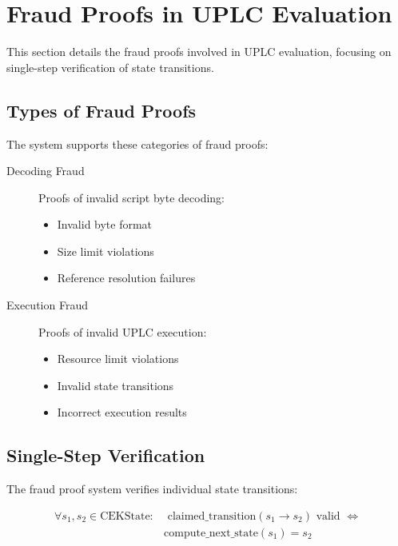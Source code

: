 \documentclass[../midgard.tex]{subfiles}
\begin{document}
\section{Fraud Proofs in UPLC Evaluation}
\label{s:phase-two-fraud-proofs}

This section details the fraud proofs involved in UPLC evaluation, focusing on single-step verification of state transitions.

\subsection{Types of Fraud Proofs}

The system supports these categories of fraud proofs:

\begin{description}
    \item[Decoding Fraud] Proofs of invalid script byte decoding:
        \begin{itemize}
            \item Invalid byte format
            \item Size limit violations
            \item Reference resolution failures
        \end{itemize}
    
    \item[Execution Fraud] Proofs of invalid UPLC execution:
        \begin{itemize}
            \item Resource limit violations
            \item Invalid state transitions
            \item Incorrect execution results
        \end{itemize}
    
\end{description}

\subsection{Single-Step Verification}

The fraud proof system verifies individual state transitions:

\begin{equation*}
\begin{split}
    \forall s_1, s_2 \in \text{CEKState}: & \text{ claimed\_transition}(s_1 \rightarrow s_2) \text{ valid } \iff \\
    & \text{compute\_next\_state}(s_1) = s_2
\end{split}
\end{equation*}
\end{document}
